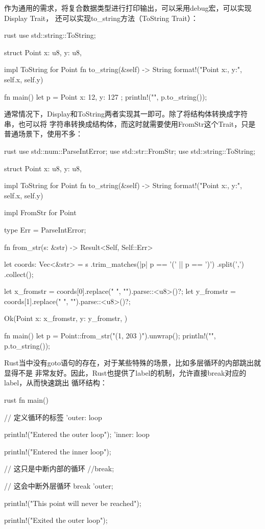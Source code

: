 作为通用的需求，将复合数据类型进行打印输出，可以采用debug宏，可以实现Display Trait，
还可以实现to\_string方法（ToString Trait）：
\begin{code-block}{rust}
use std::string::ToString;

struct Point {
    x: u8,
    y: u8,
}

impl ToString for Point {
    fn to_string(&self) -> String {
        format!("Point x:{}, y:{}", self.x, self.y)
    }
}

fn main() {
    let p = Point { x: 12, y: 127 };
    println!("{}", p.to_string());
}
\end{code-block}
通常情况下，Display和ToString两者实现其一即可。除了将结构体转换成字符串，也可以将
字符串转换成结构体，而这时就需要使用FromStr这个Trait，只是普通场景下，使用不多：
\begin{code-block}{rust}
use std::num::ParseIntError;
use std::str::FromStr;
use std::string::ToString;

struct Point {
    x: u8,
    y: u8,
}

impl ToString for Point {
    fn to_string(&self) -> String {
        format!("Point x:{}, y:{}", self.x, self.y)
    }
}

impl FromStr for Point {
    type Err = ParseIntError;

    fn from_str(s: &str) -> Result<Self, Self::Err> {
        let coords: Vec<&str> = s
            .trim_matches(|p| p == '(' || p == ')')
            .split(',')
            .collect();

        let x_fromstr = coords[0].replace(" ", "").parse::<u8>()?;
        let y_fromstr = coords[1].replace(" ", "").parse::<u8>()?;

        Ok(Point {
            x: x_fromstr,
            y: y_fromstr,
        })
    }
}

fn main() {
    let p = Point::from_str("(1, 203   )").unwrap();
    println!("{}", p.to_string());
}
\end{code-block}

Rust当中没有goto语句的存在，对于某些特殊的场景，比如多层循环的内部跳出就显得不是
非常友好。因此，Rust也提供了label的机制，允许直接break对应的label，从而快速跳出
循环结构：
\begin{code-block}{rust}
fn main() {
    // 定义循环的标签
    'outer: loop {
        println!("Entered the outer loop");
        'inner: loop {
            println!("Entered the inner loop");

            // 这只是中断内部的循环
            //break;

            // 这会中断外层循环
            break 'outer;
        }
        println!("This point will never be reached");
    }
    println!("Exited the outer loop");
}
\end{code-block}

